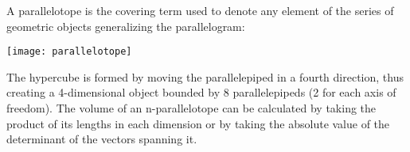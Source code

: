 \documentclass[12pt]{article}
\begin{document}

A parallelotope is the covering term used to denote any element of the series of geometric objects generalizing the parallelogram:

\begin{center}
\texttt{[image: parallelotope]}\\
\end{center}

The hypercube is formed by moving the parallelepiped in a fourth direction, thus creating a 4-dimensional object bounded by 8 parallelepipeds (2 for each axis of freedom). The volume of an n-parallelotope can be calculated by taking the product of its lengths in each dimension or by taking the absolute value of the determinant of the vectors spanning it.
\end{document}

